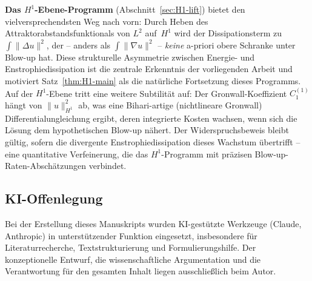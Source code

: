 \documentclass[12pt,a4paper]{article}
\theoremstyle{definition}
\theoremstyle{plain}
\theoremstyle{remark}
\begin{document}
\medskip\noindent
\textbf{Das $H^1$-Ebene-Programm} (Abschnitt~\ref{sec:H1-lift})
bietet den vielversprechendsten Weg nach vorn: Durch Heben des
Attraktorabstandsfunktionals von $L^2$ auf~$H^1$ wird der
Dissipationsterm zu $\int\|\Delta u\|^2$, der -- anders als
$\int\|\nabla u\|^2$ -- \emph{keine} a-priori obere Schranke
unter Blow-up hat. Diese strukturelle Asymmetrie zwischen Energie- und
Enstrophiedissipation ist die zentrale Erkenntnis der vorliegenden Arbeit
und motiviert Satz~\ref{thm:H1-main} als die natürliche
Fortsetzung dieses Programms.
Auf der $H^1$-Ebene tritt eine weitere Subtilität auf: Der
Gronwall-Koeffizient $C_1^{(1)}$ hängt von $\|u\|_{H^1}^2$ ab,
was eine Bihari-artige (nichtlineare Gronwall) Differentialungleichung
ergibt, deren integrierte Kosten wachsen, wenn sich die Lösung dem
hypothetischen Blow-up nähert. Der Widerspruchsbeweis bleibt gültig,
sofern die divergente Enstrophiedissipation dieses Wachstum übertrifft --
eine quantitative Verfeinerung, die das $H^1$-Programm mit präzisen
Blow-up-Raten-Abschätzungen verbindet.

\subsection*{KI-Offenlegung}
Bei der Erstellung dieses Manuskripts wurden KI-gestützte Werkzeuge (Claude, Anthropic)
in unterstützender Funktion eingesetzt, insbesondere für Literaturrecherche,
Textstrukturierung und Formulierungshilfe. Der konzeptionelle Entwurf,
die wissenschaftliche Argumentation und die Verantwortung für den gesamten Inhalt
liegen ausschließlich beim Autor.
\end{document}
